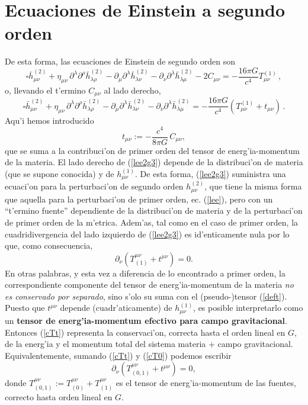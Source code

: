 \section{Ecuaciones de Einstein a segundo orden}
De esta forma, las ecuaciones de Einstein de segundo orden son
\begin{equation}\label{lee2g2}
\square \bar{h}^{(2)}_{\mu\nu}
+\eta_{\mu\nu}\, \partial^\lambda\partial^\rho\bar{h}^{(2)}_{\lambda\rho}-
\partial_\mu\partial^\lambda\bar{h}^{(2)}_{\lambda\nu}
- \partial_\nu\partial^\lambda \bar{h}^{(2)}_{\lambda\mu} -2C_{\mu\nu}=
-\frac{16\pi G}{c^4}T_{\mu\nu}^{(1)} \, ,
\end{equation}
o, llevando el t'ermino $C_{\mu\nu}$ al lado derecho,
\begin{equation}\label{lee2g3}
\boxed{\square \bar{h}^{(2)}_{\mu\nu}
+\eta_{\mu\nu}\, \partial^\lambda\partial^\rho\bar{h}^{(2)}_{\lambda\rho}-
\partial_\mu\partial^\lambda\bar{h}^{(2)}_{\lambda\nu}
- \partial_\nu\partial^\lambda \bar{h}^{(2)}_{\lambda\mu} =
-\frac{16\pi G}{c^4}\left(T_{\mu\nu}^{(1)}+t_{\mu\nu} \right)\, .}
\end{equation}
Aqu'i hemos introducido
\begin{equation}
t_{\mu\nu}:=-\frac{c^4}{8\pi G}\,C_{\mu\nu}, \label{deft}
\end{equation}
que se suma a la contribuci'on de primer orden del tensor de energ'ia-momentum de la materia. El lado derecho de (\ref{lee2g3}) depende de la distribuci'on de materia (que se supone conocida) y de $h^{(1)}_{\mu\nu}$. De esta forma, (\ref{lee2g3}) suministra una ecuaci'on para la perturbaci'on de segundo orden $h^{(2)}_{\mu\nu}$, que tiene la misma forma que aquella para la perturbaci'on de primer orden, ec. (\ref{lee}), pero con un ``t'ermino fuente'' dependiente de la distribuci'on de materia y de la perturbaci'on de primer orden de la m'etrica. Adem'as, tal como en el caso de primer orden, la cuadridivergencia del lado izquierdo de (\ref{lee2g3}) es id'enticamente nula por lo que, como consecuencia,
\begin{equation}
\partial_\nu\left(T^{\mu\nu}_{(1)}+t^{\mu\nu} \right)=0. \label{cTt}
\end{equation}
En otras palabras, y esta vez a diferencia de lo encontrado a primer orden, la correspondiente componente del tensor de energ'ia-momentum de la materia \textit{no es conservado por separado}, sino s'olo su suma con el (pseudo-)tensor (\ref{deft}). Puesto que $t^{\mu\nu}$ depende (cuadr'aticamente) de $h^{(1)}_{\mu\nu}$, es posible interpretarlo como un \textbf{tensor de energ'ia-momentum efectivo para campo gravitacional}. Entonces (\ref{cTt}) representa la conservaci'on, correcta hasta el orden lineal en $G$, de la energ'ia y el momentum total del sistema materia + campo gravitacional. Equivalentemente, sumando (\ref{cTt}) y (\ref{cT0}) podemos escribir
\begin{equation}
\boxed{\partial_\nu\left(T^{\mu\nu}_{(0,1)}+t^{\mu\nu} \right)=0,} \label{cT01t}
\end{equation}
donde $T^{\mu\nu}_{(0,1)}:=T^{\mu\nu}_{(0)}+T^{\mu\nu}_{(1)}$ es el tensor de energ'ia-momentum de las fuentes, correcto hasta orden lineal en $G$.

